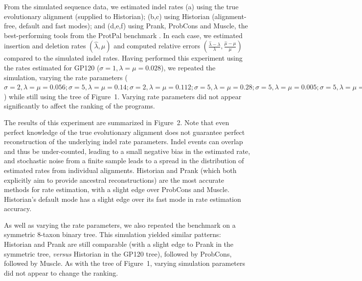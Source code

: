 \documentclass{bioinfo}
\begin{document}
From the simulated sequence data, we estimated indel rates
(a) using the true evolutionary alignment (supplied to Historian);
(b,c) using Historian (alignment-free, default and fast modes);
and
(d,e,f) using Prank, ProbCons and Muscle,
the best-performing tools from the ProtPal benchmark \citep{Westesson2012-zg}.
In each case, we estimated insertion and deletion rates $(\hat{\lambda},\hat{\mu})$ and computed relative errors $(\frac{\hat{\lambda}-\lambda}{\lambda},\frac{\hat{\mu}-\mu}{\mu})$
compared to the simulated indel rates.
Having performed this experiment
using the rates estimated for GP120 ($\sigma=1,\lambda=\mu=0.028$),
we repeated the simulation, varying the rate parameters
($\sigma=2,\lambda=\mu=0.056;
\sigma=5,\lambda=\mu=0.14;
\sigma=2,\lambda=\mu=0.112;
\sigma=5,\lambda=\mu=0.28;
\sigma=5,\lambda=\mu=0.005;
\sigma=5,\lambda=\mu=0.01$)
while still using the tree of Figure~1.
Varying rate parameters did not appear
significantly to affect the ranking of the programs.

The results of this experiment are summarized in Figure~2.
Note that even perfect knowledge of the true evolutionary alignment does not guarantee perfect reconstruction of the underlying indel rate parameters.
Indel events can overlap and thus be under-counted,
leading to a small negative bias in the estimated rate,
and stochastic noise from a finite sample leads to a spread in the distribution
of estimated rates from individual alignments.
Historian and Prank (which both explicitly aim to provide ancestral reconstructions)
are the most accurate methods for rate estimation,
with a slight edge over ProbCons and Muscle.
Historian's default mode has a slight edge over its fast mode in rate estimation accuracy.

As well as varying the rate parameters,
we also repeated the benchmark on a symmetric 8-taxon binary tree.
This simulation yielded similar patterns:
Historian and Prank are still comparable (with a slight edge to Prank in the
symmetric tree, {\em versus} Historian in the GP120 tree),
followed by ProbCons, followed by Muscle.
As with the tree of Figure~1,
varying simulation parameters did not appear to change the ranking.
\end{document}
